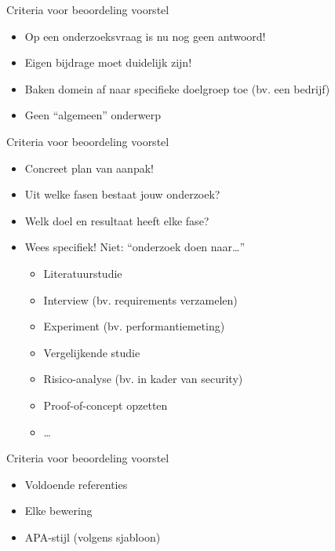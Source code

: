 \documentclass[aspectratio=169,usenames,dvipsnames]{beamer}
\begin{document}
\begin{frame}{Criteria voor beoordeling voorstel}


\begin{itemize}
  \item Op een onderzoeksvraag is nu nog geen antwoord!
  \item Eigen bijdrage moet duidelijk zijn!
  \item Baken domein af naar specifieke doelgroep toe (bv. een bedrijf)
  \item Geen ``algemeen'' onderwerp
\end{itemize}

\end{frame}

\begin{frame}{Criteria voor beoordeling voorstel}


\begin{itemize}
  \item Concreet plan van aanpak!
  \item Uit welke fasen bestaat jouw onderzoek?
  \item Welk doel en resultaat heeft elke fase?
  \item Wees specifiek! Niet: ``onderzoek doen naar\ldots''
  \begin{itemize}
    \item Literatuurstudie
    \item Interview (bv. requirements verzamelen)
    \item Experiment (bv. performantiemeting)
    \item Vergelijkende studie
    \item Risico-analyse (bv. in kader van security)
    \item Proof-of-concept opzetten
    \item \ldots
  \end{itemize}
\end{itemize}

\end{frame}

\begin{frame}{Criteria voor beoordeling voorstel}


\begin{itemize}
  \item Voldoende referenties
  \item Elke bewering
  \item APA-stijl (volgens sjabloon)
\end{itemize}

\end{frame}
\end{document}
